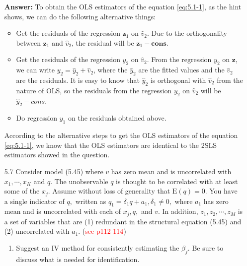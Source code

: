 \begin{enumerate}
    \textbf{Answer:} To obtain the OLS estimators of the equation \eqref{eq:5.1-1}, as the hint shows, we can do the following alternative things: 
    \begin{itemize}
        \item Get the residuals of the regression $\mathbf{z}_1$ on $\hat{v}_2$. Due to the orthogonality between $\mathbf{z}_1$ and $\hat{v}_2$, the residual will be $\mathbf{z}_1 - \mathbf{cons}$.
        \item Get the residuals of the regression $y_2$ on $\hat{v}_2$. From the regression $y_2$ on $\mathbf{z}$, we can write $y_2 = \hat{y}_2 + \hat{v}_2$, where the $\hat{y}_2$ are the fitted values and the $\hat{v}_2$ are the residuals. It is easy to know that $\hat{y}_2$ is orthogonal with $\hat{v}_2$ from the nature of OLS, so the residuals from the regression $y_2$ on $\hat{v}_2$ will be $\hat{y}_2 - cons$.
        \item Do regression $y_1$ on the residuals obtained above.
    \end{itemize}
    According to the alternative steps to get the OLS estimators of the equation \eqref{eq:5.1-1}, we know that the OLS estimators are identical to the 2SLS estimators showed in the question.
    
    
    \item[5.7] Consider model (5.45) where $v$ has zero mean and is uncorrelated with $x_{1}, \cdots, x_{K}$ and $q .$ The unobservable $q$ is thought to be correlated with at least some of the $x_{j} .$ Assume without loss of generality that $\mathrm{E}(q)=0$. You have a single indicator of $q,$ written as $q_{1}=\delta_{1} q+a_{1}, \delta_{1} \neq 0,$ where $a_{1}$ has zero mean and is uncorrelated with each of $x_{j}, q,$ and $v .$ In addition, $z_{1}, z_{2}, \cdots, z_{M}$ is a set of variables that are (1) redundant in the structural equation (5.45) and (2) uncorrelated with $a_{1}$. (\textcolor{red}{see p112-114})
    \begin{enumerate}
        \item Suggest an IV method for consistently estimating the $\beta_{j} .$ Be sure to discuss what is needed for identification.
        

\end{enumerate}
\end{enumerate}
